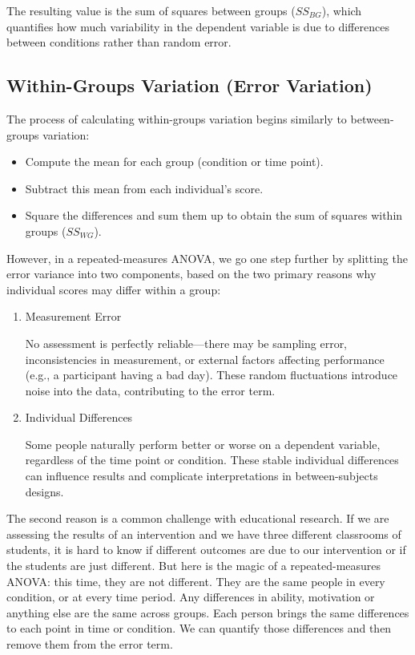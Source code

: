 \documentclass[
  letterpaper,
  DIV=11,
  numbers=noendperiod]{scrreprt}
\begin{document}
The resulting value is the sum of squares between groups (\(SS_{BG}\)),
which quantifies how much variability in the dependent variable is due
to differences between conditions rather than random error.

\subsection{Within-Groups Variation (Error
Variation)}\label{within-groups-variation-error-variation}

The process of calculating within-groups variation begins similarly to
between-groups variation:

\begin{itemize}
\item
  Compute the mean for each group (condition or time point).
\item
  Subtract this mean from each individual's score.
\item
  Square the differences and sum them up to obtain the sum of squares
  within groups (\(SS_{WG}\)).
\end{itemize}

However, in a repeated-measures ANOVA, we go one step further by
splitting the error variance into two components, based on the two
primary reasons why individual scores may differ within a group:

\begin{enumerate}
\def\labelenumi{\arabic{enumi}.}
\item
  Measurement Error

  No assessment is perfectly reliable---there may be sampling error,
  inconsistencies in measurement, or external factors affecting
  performance (e.g., a participant having a bad day). These random
  fluctuations introduce noise into the data, contributing to the error
  term.
\item
  Individual Differences

  Some people naturally perform better or worse on a dependent variable,
  regardless of the time point or condition. These stable individual
  differences can influence results and complicate interpretations in
  between-subjects designs.
\end{enumerate}

The second reason is a common challenge with educational research. If we
are assessing the results of an intervention and we have three different
classrooms of students, it is hard to know if different outcomes are due
to our intervention or if the students are just different. But here is
the magic of a repeated-measures ANOVA: this time, they are not
different. They are the same people in every condition, or at every time
period. Any differences in ability, motivation or anything else are the
same across groups. Each person brings the same differences to each
point in time or condition. We can quantify those differences and then
remove them from the error term.
\end{document}
